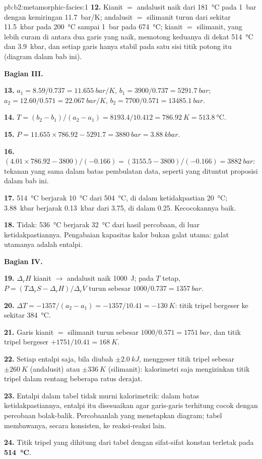 \begin{solution}{pb:b2:metamorphic-facies:1}
\textbf{12.} Kianit $=$ andalusit naik dari \qty{181}{\celsius} pada \qty{1}{bar} dengan
kemiringan \qty{11.7}{bar/K}; andalusit $=$ silimanit turun dari sekitar \qty{11.5}{kbar} pada
\qty{200}{\celsius} sampai \qty{1}{bar} pada \qty{674}{\celsius}; kianit $=$ silimanit, yang
lebih curam di antara dua garis yang naik, memotong keduanya di dekat \qty{514}{\celsius} dan \qty{3.9}{kbar}, dan setiap garis hanya stabil pada
satu sisi titik potong itu (diagram dalam bab ini).

\noindent\textbf{Bagian III.}

\textbf{13.} $a_1 = 8.59/0.737 = \qty{11.655}{bar/K}$, $b_1 = 3900/0.737 =
\qty{5291.7}{bar}$; $a_2 = 12.60/0.571 = \qty{22.067}{bar/K}$, $b_2 = 7700/0.571 =
\qty{13485.1}{bar}$.

\textbf{14.} $T = (b_2 - b_1)/(a_2 - a_1) = 8193.4/10.412 = \qty{786.92}{K} =
\qty{513.8}{\celsius}$.

\textbf{15.} $P = 11.655\times786.92 - 5291.7 = \qty{3880}{bar} = \qty{3.88}{kbar}$.

\textbf{16.} $(4.01\times786.92 - 3800)/(-0.166) = (3155.5 - 3800)/(-0.166) =
\qty{3882}{bar}$: tekanan yang sama dalam batas pembulatan data, seperti yang dituntut proposisi dalam bab ini.

\textbf{17.} \qty{514}{\celsius} berjarak \qty{10}{\celsius} dari \qty{504}{\celsius}, di dalam
ketidakpastian \qty{20}{\celsius}; \qty{3.88}{kbar} berjarak \qty{0.13}{kbar} dari 3.75,
di dalam 0.25. Kecocokannya baik.

\textbf{18.} Tidak: \qty{536}{\celsius} berjarak \qty{32}{\celsius} dari hasil percobaan, di luar
ketidakpastiannya. Pengabaian kapasitas kalor bukan galat utama: galat utamanya adalah entalpi.

\noindent\textbf{Bagian IV.}

\textbf{19.} $\Delta_r H$ kianit $\to$ andalusit naik \qty{1000}{J}; pada
$T$ tetap, $P = (T\Delta_r S - \Delta_r H)/\Delta_r V$ turun sebesar $1000/0.737 = \qty{1357}{bar}$.

\textbf{20.} $\Delta T = -1357/(a_2 - a_1) = -1357/10.41 = \qty{-130}{K}$: titik tripel
bergeser ke sekitar \qty{384}{\celsius}.

\textbf{21.} Garis kianit $=$ silimanit turun sebesar $1000/0.571 = \qty{1751}{bar}$, dan
titik tripel bergeser $+1751/10.41 = \qty{+168}{K}$.

\textbf{22.} Setiap entalpi saja, bila diubah $\pm\qty{2.0}{kJ}$, menggeser titik tripel sebesar
$\pm\qty{260}{K}$ (andalusit) atau $\pm\qty{336}{K}$ (silimanit): kalorimetri saja mengizinkan
titik tripel dalam rentang beberapa ratus derajat.

\textbf{23.} Entalpi dalam tabel tidak murni kalorimetrik: dalam batas
ketidakpastiannya, entalpi itu disesuaikan agar garis-garis terhitung cocok dengan percobaan bolak-balik.
Percobaanlah yang menetapkan diagram; tabel membawanya, secara konsisten, ke reaksi-reaksi lain.

\textbf{24.} Titik tripel yang dihitung dari tabel dengan sifat-sifat konstan terletak pada
\textbf{\qty[text-series-to-math=true]{514}{\celsius}}.
\end{solution}
